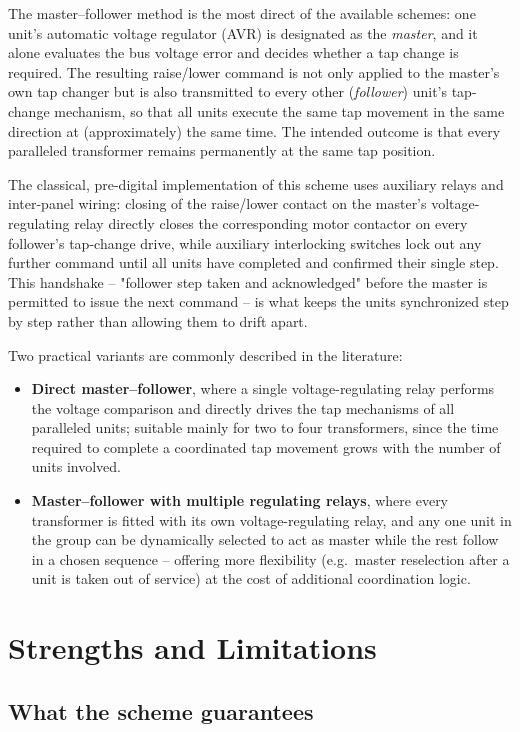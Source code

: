 \documentclass[11pt,a4paper]{article}
\begin{document}
The master--follower method is the most direct of the available schemes: one unit's automatic voltage regulator (AVR) is designated as the \emph{master}, and it alone evaluates the bus voltage error and decides whether a tap change is required. The resulting raise/lower command is not only applied to the master's own tap changer but is also transmitted to every other (\emph{follower}) unit's tap-change mechanism, so that all units execute the same tap movement in the same direction at (approximately) the same time. The intended outcome is that every paralleled transformer remains permanently at the same tap position.

The classical, pre-digital implementation of this scheme uses auxiliary relays and inter-panel wiring: closing of the raise/lower contact on the master's voltage-regulating relay directly closes the corresponding motor contactor on every follower's tap-change drive, while auxiliary interlocking switches lock out any further command until all units have completed and confirmed their single step. This handshake -- "follower step taken and acknowledged" before the master is permitted to issue the next command -- is what keeps the units synchronized step by step rather than allowing them to drift apart.

Two practical variants are commonly described in the literature:
\begin{itemize}
  \item \textbf{Direct master--follower}, where a single voltage-regulating relay performs the voltage comparison and directly drives the tap mechanisms of all paralleled units; suitable mainly for two to four transformers, since the time required to complete a coordinated tap movement grows with the number of units involved.
  \item \textbf{Master--follower with multiple regulating relays}, where every transformer is fitted with its own voltage-regulating relay, and any one unit in the group can be dynamically selected to act as master while the rest follow in a chosen sequence -- offering more flexibility (e.g.\ master reselection after a unit is taken out of service) at the cost of additional coordination logic.
\end{itemize}

\section{Strengths and Limitations}

\subsection{What the scheme guarantees}
\end{document}
